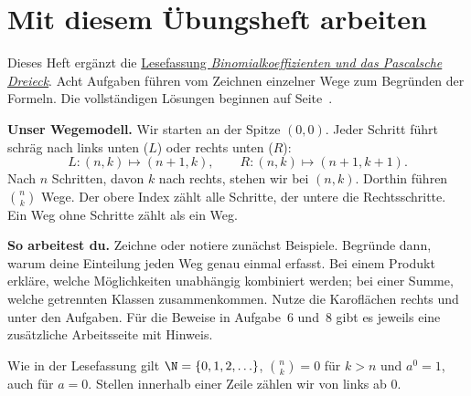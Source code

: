 \section*{Mit diesem Übungsheft arbeiten}
Dieses Heft ergänzt die
\href{_B10-binomial-reading.pdf\#binomial.reading}{Lesefassung
\emph{Binomialkoeffizienten und das Pascalsche Dreieck}}.
Acht Aufgaben führen vom Zeichnen einzelner Wege zum Begründen der
Formeln. Die vollständigen Lösungen beginnen auf Seite~\pageref{bin:solutions}.

\textbf{Unser Wegemodell.} Wir starten an der Spitze $(0,0)$.
Jeder Schritt führt schräg nach links unten ($L$) oder rechts unten ($R$):
\[
 L:(n,k)\longmapsto(n+1,k),\qquad
 R:(n,k)\longmapsto(n+1,k+1).
\]
Nach $n$ Schritten, davon $k$ nach rechts, stehen wir bei $(n,k)$.
Dorthin führen $\binom nk$ Wege. Der obere Index zählt alle Schritte,
der untere die Rechtsschritte. Ein Weg ohne Schritte zählt als ein Weg.

\textbf{So arbeitest du.} Zeichne oder notiere zunächst Beispiele.
Begründe dann, warum deine Einteilung jeden Weg genau einmal erfasst.
Bei einem Produkt erkläre, welche Möglichkeiten unabhängig kombiniert
werden; bei einer Summe, welche getrennten Klassen zusammenkommen.
Nutze die Karoflächen rechts und unter den Aufgaben. Für die Beweise
in Aufgabe~6 und~8 gibt es jeweils eine zusätzliche Arbeitsseite mit Hinweis.

Wie in der Lesefassung gilt $\N=\{0,1,2,\ldots\}$,
$\binom nk=0$ für $k>n$ und $a^0=1$, auch für $a=0$.
Stellen innerhalb einer Zeile zählen wir von links ab $0$.

\medskip\tableofcontents

